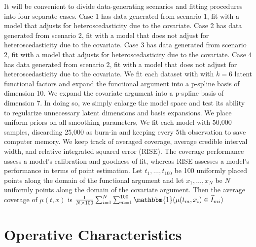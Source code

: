 \documentclass[useAMS,referee,usenatbib]{biom}
\begin{document}
It will be convenient to divide data-generating scenarios and fitting procedures into four separate cases. Case 1 has data generated from scenario 1, fit with a model that adjusts for heteroscedasticity due to the covariate. Case 2 has data generated from scenario 2, fit with a model that does not adjust for heteroscedasticity due to the covariate. Case 3 has data generated from scenario 2, fit with a model that adjusts for heteroscedasticity due to the covariate. Case 4 has data generated from scenario 2, fit with a model that does not adjust for heteroscedasticity due to the covariate. We fit each dataset with with $k = 6$ latent functional factors and expand the functional argument into a p-spline basis of dimension 10. We expand the covariate argument into a p-spline basis of dimension 7. In doing so, we simply enlarge the model space and test its ability to regularize unnecessary latent dimensions and basis expansions. We place uniform priors on all smoothing parameters, We fit each model with 50,000 samples, discarding 25,000 as burn-in and keeping every 5th observation to save computer memory. We keep track of averaged coverage, average credible interval width, and relative integrated squared error (RISE). The coverage performance assess a model's calibration and goodness of fit, whereas RISE assesses a model's performance in terms of point estimation. Let $t_{1}, \ldots, t_{100}$ be 100 uniformly placed points along the domain of the functional argument and let $x_{1},\ldots,x_{N}$ be $N$ uniformly points along the domain of the covariate argument. Then the average coverage of $\mu(t, x)$ is $\frac{1}{N\times 100}\sum_{i=1}^{N}\sum_{m=1}^{100}\mathbbm{1}(\mu(t_{m}, x_{i}) \in \widehat{I}_{mi})$

\section{Operative Characteristics}
\label{s:simulation}
\end{document}
